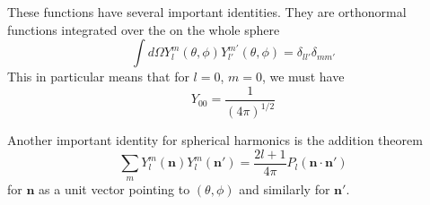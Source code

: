 These functions have several important identities.  They are orthonormal functions integrated over the on the whole sphere
\begin{equation}
  \int d\Omega Y_l^m (\theta,\phi) Y_{l'}^{m'}(\theta,\phi) = \delta_{ll'} \delta_{mm'}
\end{equation}
This in particular means that for $l=0$, $m=0$, we must have
\begin{equation}
  Y_{00} = \frac{1}{(4\pi)^{1/2}}
\end{equation}

Another important identity for spherical harmonics is the addition theorem
\begin{equation}
  \sum_{m} Y_l^m(\mathbf{n}) Y_l^m(\mathbf{n}') = \frac{2l+1}{4\pi} P_l(\mathbf{n \cdot n}') 
\end{equation}
for $\mathbf{n}$ as a unit vector pointing to $(\theta,\phi)$ and similarly for $\mathbf{n}'$.
